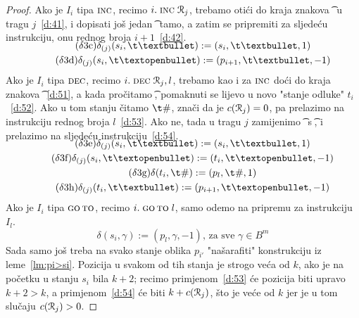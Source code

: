 \begin{proof}
Ako je $I_i$ tipa $\textsc{inc}$, recimo  $i.\;\textsc{inc}\;\mathcal R_{j}$, trebamo otići do kraja znakova \t\textbullet\ u tragu $j$~\eqref{d:41}, i dopisati još jedan \t\textbullet\ tamo, a zatim se pripremiti za sljedeću instrukciju, onu rednog broja $i+1$~\eqref{d:42}.
\begin{gather*}
\SwapAboveDisplaySkip
\label{d:41}\tag{$\delta$3c}
    \delta_{(j)}(s_i,\t\textbullet):=(s_i,\t\textbullet,1)\\
\label{d:42}\tag{$\delta$3d}
    \delta_{(j)}(s_i,\t\textopenbullet):=(p_{i+1},\t\textbullet,-1)
\end{gather*}
Ako je $I_i$ tipa $\textsc{dec}$, recimo $i.\;\textsc{dec}\;\mathcal R_{j},l$, trebamo kao i za $\textsc{inc}$ doći do kraja znakova~\t\textbullet~\eqref{d:51}, a kada pročitamo \t\textopenbullet, pomaknuti se lijevo u novo "stanje odluke" $t_i$~\eqref{d:52}. Ako u tom stanju čitamo $\t\#$, znači da je $c(\mathcal R_{j})=0$, pa prelazimo na instrukciju rednog broja $l$~\eqref{d:53}. Ako ne, tada u tragu $j$ zamijenimo \t\textbullet\ s \t\textopenbullet, i prelazimo na sljedeću instrukciju~\eqref{d:54}.
\begin{gather*}
\SwapAboveDisplaySkip
\label{d:51}\tag{$\delta$3e}
    \delta_{(j)}(s_i,\t\textbullet):=(s_i,\t\textbullet,1)\\
\label{d:52}\tag{$\delta$3f}
    \delta_{(j)}(s_i,\t\textopenbullet):=(t_i,\t\textopenbullet,-1)\\
\label{d:53}\tag{$\delta$3g}
    \delta(t_i,\t\#):=(p_l,\t\#,1)\\
\label{d:54}\tag{$\delta$3h}
    \delta_{(j)}(t_i,\t\textbullet):=(p_{i+1},\t\textopenbullet,-1)
\end{gather*}
Ako je $I_i$ tipa $\textsc{go\,to}$, recimo $i.\;\textsc{go\,to}\;l$, samo odemo na pripremu za instrukciju $I_l$.
\begin{equation*}
\label{d:61}\tag{$\delta$3i}
    \delta(s_i,\gamma):=(p_l,\gamma,-1)\text{, za sve $\gamma\in B^m$}
\end{equation*}
Sada samo još treba na svako stanje oblika $p_{i'}$ "našarafiti" konstrukciju iz leme~\ref{lm:pi>si}. Pozicija u svakom od tih stanja je strogo veća od $k$, ako je na početku u stanju $s_i$ bila $k+2$; recimo primjenom~\eqref{d:53} će pozicija biti upravo $k+2>k$, a primjenom~\eqref{d:54} će biti $k+c(\mathcal R_{j})$, što je veće od $k$ jer je u tom slučaju $c(\mathcal R_{j})>0$.
\end{proof}


